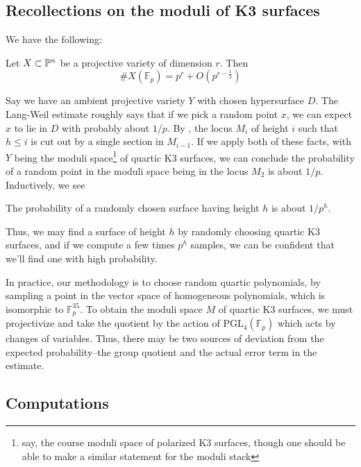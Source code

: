 \subsection{Recollections on the moduli of K3 surfaces}

We have the following:

\begin{thm}
	Let \(X \subset \mathbb{P}^{n}\)
	be a projective variety of dimension \(r\). 
	Then 
	\[
		\#X(\mathbb{F}_{p}) = p^r + O(p^{r - \frac{1}{2}})
	\] 
\end{thm}

Say we have an ambient projective variety
\(Y\) with chosen
hypersurface \(D\).
The Lang-Weil estimate roughly
says that if we pick a random point \(x\),
we can expect \(x\) to lie in \(D\) 
with probably about \(1 / p\).
By \cite[Section~7]{artin-1974-k3-surfaces}, 
the locus \(M_{i}\) of height \(i\) such that \(h \leq i\)
is cut out by a single section in 
\(M_{i-1}\).
If we apply both of these facts,
with \(Y\) being the 
moduli space\footnote{
	say, the course moduli space of polarized K3 surfaces,
	though one should be able to make a similar statement
	for the moduli stack
} of quartic K3 surfaces,
we can conclude 
the probability of a random point 
in the moduli space being in the locus
\(M_{2}\) is about \(1 / p\). 
Inductively, we see 

\begin{heur}
The probability of a randomly
chosen surface having height \(h\) is about \(1 / p^{h}\).
\end{heur}

Thus, we may find a surface of height \(h\) by 
randomly choosing quartic K3 surfaces, and 
if we compute a few times \(p^{h}\) 
samples, we can be confident that we'll find
one with high probability.

In practice, our methodology is to choose
random quartic polynomials,
by sampling a point in the vector space
of homogeneous polynomials, which is isomorphic to
\(\mathbb{F}_{p}^{35}\).
To obtain the moduli space \(M\) of quartic K3 surfaces, 
we must projectivize and take the quotient by the action of 
\(\text{PGL}_{4}(\mathbb{F}_{p})\) which acts by changes of variables. 
Thus, there may be two sources of deviation from the expected
probability--the group quotient and the actual 
error term in the estimate.

\subsection{Computations}

